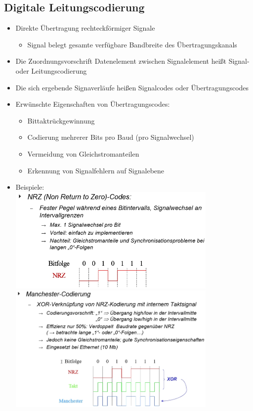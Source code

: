 \documentclass{scrreprt}
\begin{document}
\subsection*{Digitale Leitungscodierung}
\label{sec:Leitungscodierung}
\begin{itemize}
	\item Direkte Übertragung rechteckförmiger Signale
	      \begin{itemize}
		      \item Signal belegt gesamte verfügbare Bandbreite des Übertragungskanals
	      \end{itemize}
	\item Die Zuordnungsvorschrift Datenelement zwischen Signalelement heißt Signal- oder Leitungscodierung
	\item Die sich ergebende Signaverläufe heißen Signalcodes oder Übertragungscodes
	\item Erwünschte Eigenschaften von Übertragungscodes:
	      \begin{itemize}
		      \item Bittaktrückgewinnung
		      \item Codierung mehrerer Bits pro Baud (pro Signalwechsel)
		      \item Vermeidung von Gleichstromanteilen
		      \item Erkennung von Signalfehlern auf Signalebene
	      \end{itemize}
	\item Beispiele: 
		  \\
	      \includegraphics[width=0.80\textwidth]{"graphics/NRZ"}
	      \\
	      \includegraphics[width=0.80\textwidth]{"graphics/Manchester"}

\end{itemize}
\end{document}
